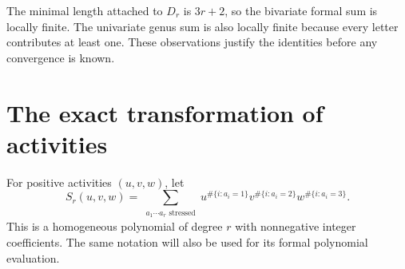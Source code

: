 \documentclass[11pt,letterpaper]{article}
\theoremstyle{definition}
\begin{document}
The minimal length attached to $D_r$ is $3r+2$, so the bivariate formal sum is locally finite. The univariate genus sum is also locally finite because every letter contributes at least one. These observations justify the identities before any convergence is known.

\section{The exact transformation of activities}\label{ska:sec:transform}
For positive activities $(u,v,w)$, let
\begin{equation}\label{ska:eq:weightedpoly}
S_r(u,v,w)=\sum_{\substack{a_1\cdots a_r\text{ stressed}}}
u^{\#\{i:a_i=1\}}v^{\#\{i:a_i=2\}}w^{\#\{i:a_i=3\}}.
\end{equation}
This is a homogeneous polynomial of degree $r$ with nonnegative integer coefficients. The same notation will also be used for its formal polynomial evaluation.
\end{document}
